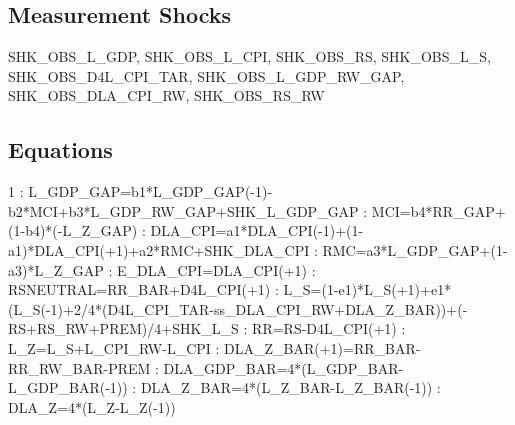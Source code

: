 \documentclass{article}%
\begin{document}
%
\subsection{Measurement Shocks}%
\label{subsec:MeasurementShocks}%
SHK\_OBS\_L\_GDP, SHK\_OBS\_L\_CPI, SHK\_OBS\_RS, SHK\_OBS\_L\_S, SHK\_OBS\_D4L\_CPI\_TAR, SHK\_OBS\_L\_GDP\_RW\_GAP, SHK\_OBS\_DLA\_CPI\_RW, SHK\_OBS\_RS\_RW

%
\subsection{Equations}%
\label{subsec:Equations}%
 1    :  L\_GDP\_GAP=b1*L\_GDP\_GAP({-}1){-}b2*MCI+b3*L\_GDP\_RW\_GAP+SHK\_L\_GDP\_GAP\newline%
    :  MCI=b4*RR\_GAP+(1{-}b4)*({-}L\_Z\_GAP)\newline%
    :  DLA\_CPI=a1*DLA\_CPI({-}1)+(1{-}a1)*DLA\_CPI(+1)+a2*RMC+SHK\_DLA\_CPI\newline%
    :  RMC=a3*L\_GDP\_GAP+(1{-}a3)*L\_Z\_GAP\newline%
    :  E\_DLA\_CPI=DLA\_CPI(+1)\newline%
    :  RSNEUTRAL=RR\_BAR+D4L\_CPI(+1)\newline%
    :  L\_S=(1{-}e1)*L\_S(+1)+e1*(L\_S({-}1)+2/4*(D4L\_CPI\_TAR{-}ss\_DLA\_CPI\_RW+DLA\_Z\_BAR))+({-}RS+RS\_RW+PREM)/4+SHK\_L\_S\newline%
    :  RR=RS{-}D4L\_CPI(+1)\newline%
   :  L\_Z=L\_S+L\_CPI\_RW{-}L\_CPI\newline%
   :  DLA\_Z\_BAR(+1)=RR\_BAR{-}RR\_RW\_BAR{-}PREM\newline%
   :  DLA\_GDP\_BAR=4*(L\_GDP\_BAR{-}L\_GDP\_BAR({-}1))\newline%
   :  DLA\_Z\_BAR=4*(L\_Z\_BAR{-}L\_Z\_BAR({-}1))\newline%
   :  DLA\_Z=4*(L\_Z{-}L\_Z({-}1))\newline%
\end{document}
